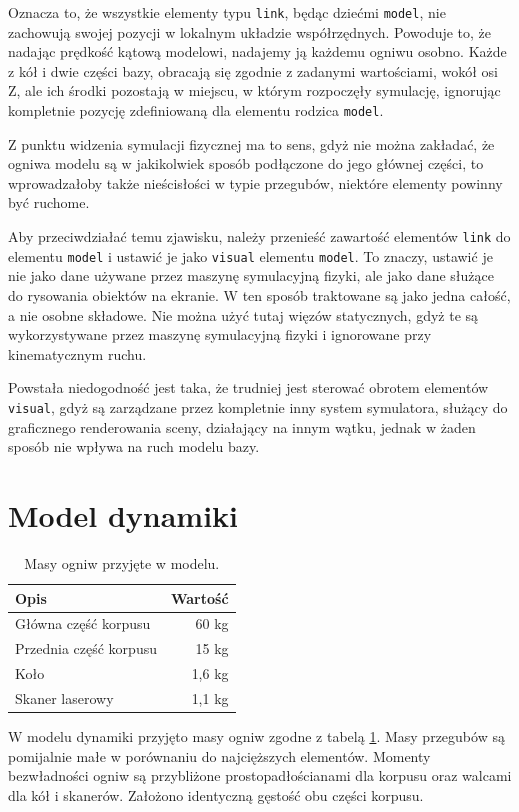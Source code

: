 		Oznacza to, że wszystkie elementy typu \texttt{link}, będąc dziećmi \texttt{model}, nie zachowują swojej pozycji w lokalnym układzie współrzędnych.
		Powoduje to, że nadając prędkość kątową modelowi, nadajemy ją każdemu ogniwu osobno.
		Każde z kół i dwie części bazy, obracają się zgodnie z zadanymi wartościami, wokół osi Z, ale ich środki pozostają w miejscu, w którym rozpoczęły symulację,
		ignorując kompletnie pozycję zdefiniowaną dla elementu rodzica \texttt{model}.
		
		Z punktu widzenia symulacji fizycznej ma to sens, gdyż nie można zakładać, że ogniwa modelu są w jakikolwiek sposób podłączone do jego głównej części, 
		to wprowadzałoby także nieścisłości w typie przegubów, niektóre elementy powinny być ruchome.

		Aby przeciwdziałać temu zjawisku, należy przenieść zawartość elementów \texttt{link} do elementu \texttt{model} i ustawić je jako \texttt{visual} elementu \texttt{model}.
		To znaczy, ustawić je nie jako dane używane przez maszynę symulacyjną fizyki, ale jako dane służące do rysowania obiektów na ekranie.
		W ten sposób traktowane są jako jedna całość, a nie osobne składowe.
		Nie można użyć tutaj więzów statycznych, gdyż te są wykorzystywane przez maszynę symulacyjną fizyki i ignorowane przy kinematycznym ruchu.

		Powstała niedogodność jest taka, że trudniej jest sterować obrotem elementów \texttt{visual}, gdyż są zarządzane przez kompletnie inny system symulatora,
		służący do graficznego renderowania sceny, działający na innym wątku, jednak w żaden sposób nie wpływa na ruch modelu bazy.
		
\section{Model dynamiki}
	\begin{table}
		\centering
		\begin{tabular}{l r}
		Opis & Wartość \\
		\hline
		Główna część korpusu	&	60 kg \\
		Przednia część korpusu	&	15 kg \\
		Koło					&	1,6 kg \\
		Skaner laserowy			&	1,1 kg \\
		\end{tabular}
		\caption{Masy ogniw przyjęte w modelu.}
		\label{tab:masses}
	\end{table}
	
	W modelu dynamiki przyjęto masy ogniw zgodne z tabelą \ref{tab:masses}.
	Masy przegubów są pomijalnie małe w porównaniu do najcięższych elementów.
	Momenty bezwładności ogniw są przybliżone prostopadłościanami dla korpusu oraz walcami dla kół i skanerów.
	Założono identyczną gęstość obu części korpusu.
	
